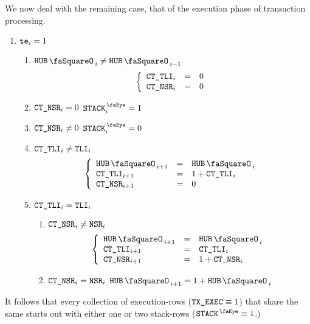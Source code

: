 We now deal with the remaining case, that of the execution phase of transaction processing.
\begin{enumerate}[resume]
	\item \If $\texttt{te}_{i} = 1$ \Then
		\begin{enumerate}
			\item \If $\hubStamp_{i} \neq \hubStamp_{i - 1}$ \Then 
				\[
					\left\{ \begin{array}{lcl}
						\texttt{CT}\texttt{\_}\texttt{TLI}          _{i} & = & 0 \\
						\texttt{CT}\texttt{\_}\texttt{NSR} _{i} & = & 0 \\
					\end{array} \right.
				\]
			\item \If $\texttt{CT}\texttt{\_}\texttt{NSR} _{i} =    0$ \Then $\peekStack _{i} = 1$
			\item \If $\texttt{CT}\texttt{\_}\texttt{NSR} _{i} \neq 0$ \Then $\peekStack _{i} = 0$
			\item \If $\texttt{CT}\texttt{\_}\texttt{TLI}_{i} \neq \texttt{TLI}_{i}$ \Then 
				\[
					\left\{ \begin{array}{lcl}
						\hubStamp            _{i + 1} & = & \hubStamp_{i}       \\
						\tliCounter          _{i + 1} & = & 1 + \tliCounter_{i} \\
						\nonStackRowsCounter _{i + 1} & = & 0                   \\
					\end{array} \right.
				\]
			\item \If $\texttt{CT}\texttt{\_}\texttt{TLI}_{i} = \texttt{TLI}_{i}$ \Then 
				\begin{enumerate}
					\item \If $\texttt{CT}\texttt{\_}\texttt{NSR}_{i} \neq \texttt{NSR}_{i}$ \Then
						\[
							\left\{ \begin{array}{lcl}
								\hubStamp            _{i + 1} & = & \hubStamp_{i}                \\
								\tliCounter          _{i + 1} & = & \tliCounter_{i}              \\
								\nonStackRowsCounter _{i + 1} & = & 1 + \nonStackRowsCounter_{i} \\
							\end{array} \right.
						\]
					\item \If $\texttt{CT}\texttt{\_}\texttt{NSR}_{i} = \texttt{NSR}_{i}$ \Then $\hubStamp_{i + 1} = 1 + \hubStamp_{i}$
				\end{enumerate}
		\end{enumerate}
\end{enumerate}
\saNote{} It follows that every collection of execution-rows ($\texttt{TX}\texttt{\_EXEC} \equiv 1$) that share the same \hubStamp{} starts out with either one or two stack-rows ($\peekStack \equiv 1$.)

